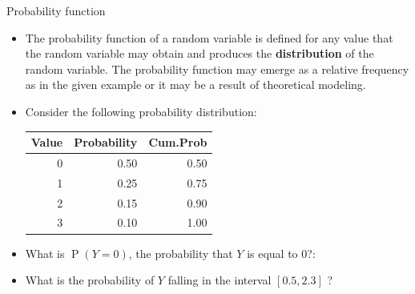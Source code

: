 \documentclass[10pt,handout]{beamer}\usepackage[]{graphicx}\usepackage[]{color}
\newenvironment{knitrout}{}{} %
\newcommand{\Prob}{\operatorname{P}}
\begin{document}
\begin{frame}[fragile]{Probability function}
	\small
	\begin{itemize}
		
		\item The probability function of a random variable is defined for any value
		that the random variable may obtain and produces the \textbf{distribution} of
		the random variable. The probability function may emerge as a relative
		frequency as in the given example or it may be a result of theoretical
		modeling.
		
		\item Consider the following probability distribution:
		
\begin{knitrout}\small
{}\color{fgcolor}
\begin{tabular}{rrr}
\toprule
Value & Probability & Cum.Prob\\
\midrule
0 & 0.50 & 0.50\\
1 & 0.25 & 0.75\\
2 & 0.15 & 0.90\\
3 & 0.10 & 1.00\\
\bottomrule
\end{tabular}

\end{knitrout}
		
		\item What is $\Prob(Y=0)$, the probability that $Y$ is equal to 0?:
		
		\item What is the probability of $Y$ falling in the interval $[0.5, 2.3]$ ?
		
		
	\end{itemize}
	
\end{frame}
\end{document}
